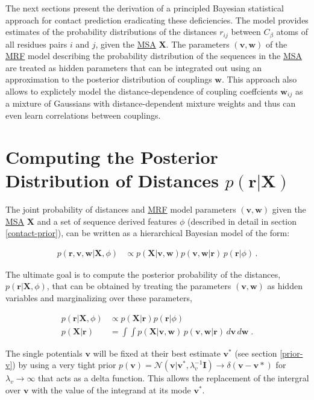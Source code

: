 \documentclass[12pt,a4paper,twoside]{book}
\newcommand{\Cb}{C_\beta}
\newcommand{\Gauss}{\mathcal{N}}
\newcommand{\I}{\mathbf{I}}
\renewcommand{\r}{\mathbf{r}}
\newcommand{\rij}{r_{ij}}
\renewcommand{\v}{\mathbf{v}}
\newcommand{\w}{\mathbf{w}}
\newcommand{\wij}{\mathbf{w}_{ij}}
\newcommand{\X}{\mathbf{X}}
\theoremstyle{definition}
\theoremstyle{definition}
\theoremstyle{remark}
\begin{document}
The next sections present the derivation of a principled Bayesian
statistical approach for contact prediction eradicating these
deficiencies. The model provides estimates of the probability
distributions of the distances \(\rij\) between \(\Cb\) atoms of all
residues pairs \(i\) and \(j\), given the
\protect\hyperlink{abbrev}{MSA} \(\X\). The parameters \((\v, \w)\) of
the \protect\hyperlink{abbrev}{MRF} model describing the probability
distribution of the sequences in the \protect\hyperlink{abbrev}{MSA} are
treated as hidden parameters that can be integrated out using an
approximation to the posterior distribution of couplings \(\w\). This
approach also allows to explictely model the distance-dependence of
coupling coeffcients \(\wij\) as a mixture of Gaussians with
distance-dependent mixture weights and thus can even learn correlations
between couplings.

\section{\texorpdfstring{Computing the Posterior Distribution of
Distances
\(p(\r | \X)\)}{Computing the Posterior Distribution of Distances p(\textbackslash{}r \textbar{} \textbackslash{}X)}}\label{overview-posterior-distances}

The joint probability of distances and \protect\hyperlink{abbrev}{MRF}
model parameters \((\v, \w)\) given the \protect\hyperlink{abbrev}{MSA}
\(\X\) and a set of sequence derived features \(\phi\) (described in
detail in section \ref{contact-prior}), can be written as a hierarchical
Bayesian model of the form:

\begin{align}
        p(\r, \v, \w | \X, \phi) &\propto p(\X | \v, \w) p(\v, \w | \r) \, p(\r | \phi ) \, .
\label{eq:hierarchical-bayesian-model}
\end{align}

The ultimate goal is to compute the posterior probability of the
distances, \(p(\r | \X, \phi)\), that can be obtained by treating the
parameters \((\v, \w)\) as hidden variables and marginalizing over these
parameters,

\begin{align}
    p(\r | \X , \phi) &\propto  p(\X | \r) p(\r | \phi)\\
    p(\X | \r) &= \int \int p(\X | \v,\w) \, p(\v, \w | \r) \,d\v\,d\w  \; .
\label{eq:integrate-out-vw}
\end{align}

The single potentials \(\v\) will be fixed at their best estimate
\(\v^*\) (see section \ref{prior-v}) by using a very tight prior
\(p(\v) = \Gauss(\v|\v^*,\lambda_v^{-1} \I) \rightarrow \delta(\v-\v*)\)
for \(\lambda_v \rightarrow \infty\) that acts as a delta function. This
allows the replacement of the intergral over \(\v\) with the value of
the integrand at its mode \(\v^*\).
\end{document}

